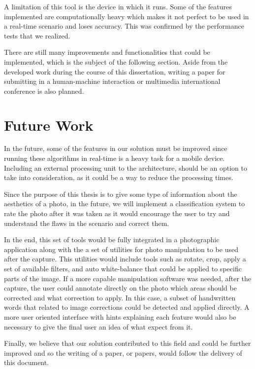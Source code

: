 A limitation of this tool is the device in which it runs. Some of the features implemented are computationally heavy which makes it not perfect to be used in a real-time scenario and loses accuracy. This was confirmed by the performance tests that we realized.

There are still many improvements and functionalities that could be implemented, which is the subject of the following section. Aside from the developed work during the course of this dissertation, writing a paper for submitting in a human-machine interaction or multimedia international conference is also planned.

\section{Future Work}
\label{sec:future}

In the future, some of the features in our solution must be improved since running these algorithms in real-time is a heavy task for a mobile device. Including an external processing unit to the architecture, should be an option to take into consideration, as it could be a way to reduce the processing times.

Since the purpose of this thesis is to give some type of information about the aesthetics of a photo, in the future, we will implement a classification system to rate the photo after it was taken as it would encourage the user to try and understand the flaws in the scenario and correct them.

In the end, this set of tools would be fully integrated in a photographic application along with the a set of utilities for photo manipulation to be used after the capture. This utilities would include tools such as rotate, crop, apply a set of available filters, and auto white-balance that could be applied to specific parts of the image. If a more capable manipulation software was needed, after the capture, the user could annotate directly on the photo which areas should be corrected and what correction to apply. In this case, a subset of handwritten words that related to image corrections could be detected and applied directly. A more user oriented interface with hints explaining each feature would also be necessary to give the final user an idea of what expect from it.

Finally, we believe that our solution contributed to this field and could be further improved and so the writing of a paper, or papers, would follow the delivery of this document.